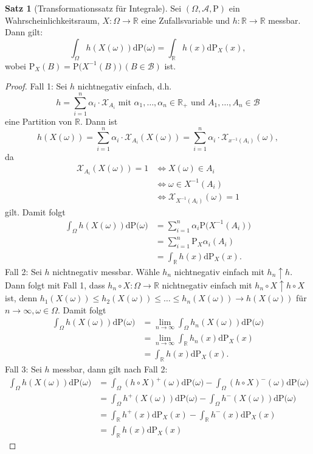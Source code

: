 \documentclass[a4paper,12pt,fleqn]{scrartcl}
\newcommand{\R}{\mathbb{R}}
\newcommand{\m}[1]{\mathcal{ #1 }}
\newcommand{\p}[1]{\text{P(} #1 \text{)}}
\newcommand{\WR}{Wahrscheinlichkeitsraum}
\theoremstyle{definition}
\newtheorem{satz}[definition]{Satz}
\theoremstyle{plain}
\theoremstyle{remark}
\begin{document}
\begin{satz}[Transformationssatz für Integrale]
Sei $(\Omega , \m{A} , \text{P})$ ein \WR, $X: \Omega \rightarrow \R$ eine Zufallsvariable und $h: \R \rightarrow \R$ messbar. Dann gilt:
\[\int_\Omega h(X(\omega)) \mathrm{d}\p{\omega} = \int_\R h(x) \mathrm{d}\text{P}_X(x),\]
wobei $\text{P}_X(B) = \p{X^{-1}(B)} \, (B \in \m{B})$ ist.
\end{satz}
\begin{proof}
Fall 1: Sei $h$ nichtnegativ einfach, d.h. 
\[h = \sum_{i=1}^n \alpha_i \cdot \m{X}_{A_i} \text{ mit } \alpha_1 , \ldots , \alpha_n \in \R_+ \text{ und } A_1 , \ldots , A_n \in \m{B}\]
eine Partition von $\R$. Dann ist
\[h(X(\omega)) = \sum_{i=1}^n \alpha_i \cdot \m{X}_{A_i} (X(\omega)) = \sum_{i=1}^n \alpha_i \cdot \m{X}_{x^{-1}(A_i)} (\omega),\]
da
\begin{align*}
\m{X}_{A_i} (X(\omega)) = 1 &\Leftrightarrow X(\omega) \in A_i \\
&\Leftrightarrow \omega \in X^{-1} (A_i) \\
&\Leftrightarrow \m{X}_{X^{-1} (A_i)} (\omega) = 1
\end{align*}
gilt. Damit folgt
\begin{align*}
\int_\Omega h(X(\omega)) \mathrm{d} \p{\omega} &= \sum_{i=1}^n \alpha_i \p{X^{-1} (A_i)} \\
&= \sum_{i=1}^n \text{P}_X \alpha_i (A_i) \\
&= \int_\R h(x) \mathrm{d} \text{P}_X(x).
\end{align*}
Fall 2: Sei $h$ nichtnegativ messbar. Wähle $h_n$ nichtnegativ einfach mit $h_n \uparrow h$. Dann folgt mit Fall 1, dass $h_n \circ X: \Omega \rightarrow \R$ nichtnegativ einfach mit $h_n \circ X \uparrow h \circ X$ ist, denn $h_1(X(\omega)) \leq h_2(X(\omega)) \leq \ldots \leq h_n(X(\omega)) \rightarrow h(X(\omega))$ für $n \rightarrow \infty, \omega \in \Omega$. Damit folgt
\begin{align*}
\int_\Omega h(X(\omega)) \mathrm{d}\p{\omega} &= \lim_{n \rightarrow \infty} \int_\Omega h_n (X(\omega)) \mathrm{d}\p{\omega} \\
&= \lim_{n \rightarrow \infty} \int_\R h_n(x) \mathrm{d}\text{P}_X(x) \\
&= \int_\R h(x) \mathrm{d}\text{P}_X(x).
\end{align*}
Fall 3: Sei $h$ messbar, dann gilt nach Fall 2:
\begin{align*}
\int_\Omega h(X(\omega)) \mathrm{d}\p{\omega} &= \int_\Omega (h \circ X)^+ (\omega) \mathrm{d}\p{\omega} - \int_\Omega (h \circ X)^- (\omega) \mathrm{d}\p{\omega} \\
&= \int_\Omega h^+(X(\omega)) \mathrm{d}\p{\omega} - \int_\Omega h^-(X(\omega)) \mathrm{d}\p{\omega} \\
&= \int_\R h^+(x) \mathrm{d}\text{P}_X(x) - \int_\R h^-(x) \mathrm{d}\text{P}_X(x) \\
&= \int_\R h(x) \mathrm{d}\text{P}_X(x)
\end{align*}
\end{proof}
\end{document}
